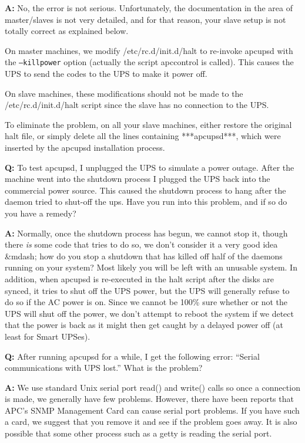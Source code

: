 \begin{description}
\item {\bf A:}
No, the error is not serious. Unfortunately, the documentation in the area of
master/slaves is not very detailed, and for that reason, your slave setup is
not totally correct as explained below.  

On master machines, we modify /etc/rc.d/init.d/halt to re-invoke apcupsd with
the {\tt --killpower} option (actually the script apccontrol is called). This
causes the UPS to send the codes to the UPS to make it power off.  

On slave machines, these modifications should not be made to the
/etc/rc.d/init.d/halt script since the slave has no connection to the UPS.  

To eliminate the problem, on all your slave machines, either restore the
original halt file, or simply delete all the lines containing ***apcupsd***,
which were inserted by the apcupsd installation process.  

\item {\bf Q:}
To test apcupsd, I unplugged the UPS to simulate a power outage. After the
machine went into the shutdown process I plugged the UPS back into the
commercial power source. This caused the shutdown process to hang after the
daemon tried to shut-off the ups. Have you run into this problem, and if so do
you have a remedy?  

\item {\bf A:}
Normally, once the shutdown process has begun, we cannot stop it, though there
{\it is} some code that tries to do so, we don't consider it a very good idea
\&mdash; how do you stop a shutdown that has killed off half of the daemons
running on your system? Most likely you will be left with an unusable system.
In addition, when apcupsd is re-executed in the halt script after the disks
are synced, it tries to shut off the UPS power, but the UPS will generally
refuse to do so if the AC power is on. Since we cannot be 100\% sure whether
or not the UPS will shut off the power, we don't attempt to reboot the system
if we detect that the power is back as it might then get caught by a delayed
power off (at least for Smart UPSes).  

\item {\bf Q:}
After running apcupsd for a while, I get the following error: ``Serial
communications with UPS lost.'' What is the problem?  

\item {\bf A:}
We use standard Unix serial port read() and write() calls so once a connection
is made, we generally have few problems. However, there have been reports that
APC's SNMP Management Card can cause serial port problems. If you have such a
card, we suggest that you remove it and see if the problem goes away. It is
also possible that some other process such as a getty is reading the serial
port.  


\end{description}

